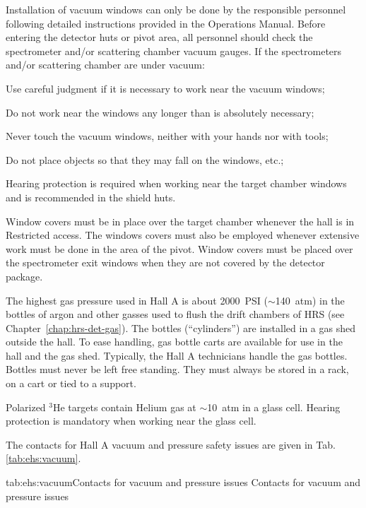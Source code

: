 Installation of vacuum windows can only be done by the responsible personnel following
detailed instructions provided in the Operations Manual.
Before entering the detector huts or pivot area, all personnel should
check the spectrometer and/or scattering chamber vacuum gauges. If the spectrometers 
and/or scattering chamber are under vacuum:
 \begin{list}{--}{\setlength{\itemsep}{-0.cm}}
    \item Use careful judgment if it is necessary to work near the vacuum windows;
    \item Do not work near the windows any longer than is absolutely necessary;
    \item Never touch the vacuum windows, neither with your hands nor with tools;
    \item Do not place objects so that they may fall on the windows, etc.;
    \item Hearing protection is required when working near the target chamber windows and 
          is recommended in the shield huts.
 \end{list}

Window covers must be in place over the target chamber whenever the hall is in
Restricted access. The windows covers must also be employed whenever extensive 
work must be done in the area of the pivot.
Window covers must be placed over the spectrometer exit windows when they are
not covered by the detector package.

The highest gas pressure used in Hall A is about 2000~PSI ($\sim$140~atm) in the bottles
of argon and other gasses used to flush the drift chambers of HRS 
(see Chapter~\ref{chap:hrs-det-gas}). The bottles (``cylinders'') are installed
in a gas shed outside the hall. To ease handling, gas bottle carts are available for use 
in the hall and the gas shed. Typically, the Hall A technicians handle the gas bottles. 
Bottles must never be left free standing. They must always be stored in a rack, 
on a cart or tied to a support.

Polarized $^3$He targets contain Helium gas at $\sim$10~atm in a glass cell.
Hearing protection is mandatory when working near the glass 
cell.   
 
 The contacts for Hall A vacuum and pressure safety issues are given in Tab.\ref{tab:ehs:vacuum}.
 
 \begin{namestab}{tab:ehs:vacuum}{Contacts for vacuum and pressure issues}{%
   Contacts for vacuum and pressure issues}
 \end{namestab}

